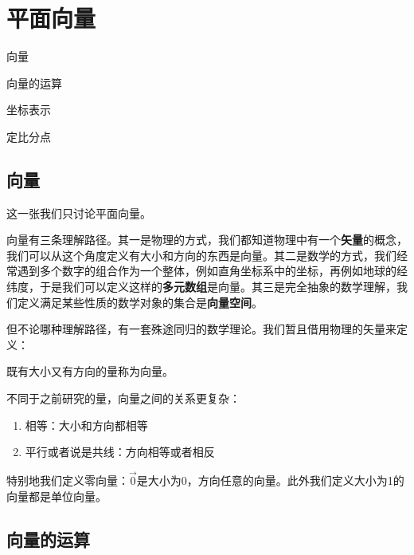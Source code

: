 \chapter{平面向量}
\begin{introduction}
    \item 向量
    \item 向量的运算
    \item 坐标表示
    \item 定比分点
\end{introduction}

\section{向量}
这一张我们只讨论平面向量。

向量有三条理解路径。其一是物理的方式，我们都知道物理中有一个\textbf{矢量}的概念，我们可以从这个角度定义有大小和方向的东西是向量。其二是数学的方式，我们经常遇到多个数字的组合作为一个整体，例如直角坐标系中的坐标，再例如地球的经纬度，于是我们可以定义这样的\textbf{多元数组}是向量。其三是完全抽象的数学理解，我们定义满足某些性质的数学对象的集合是\textbf{向量空间}。

但不论哪种理解路径，有一套殊途同归的数学理论。我们暂且借用物理的矢量来定义：
\begin{definition}[向量]
    既有大小又有方向的量称为向量。
\end{definition}

不同于之前研究的量，向量之间的关系更复杂：
\begin{enumerate}
    \item 相等：大小和方向都相等
    \item 平行或者说是共线：方向相等或者相反
\end{enumerate}

特别地我们定义零向量：$\Vec{0}$是大小为0，方向任意的向量。此外我们定义大小为1的向量都是单位向量。

\section{向量的运算}
